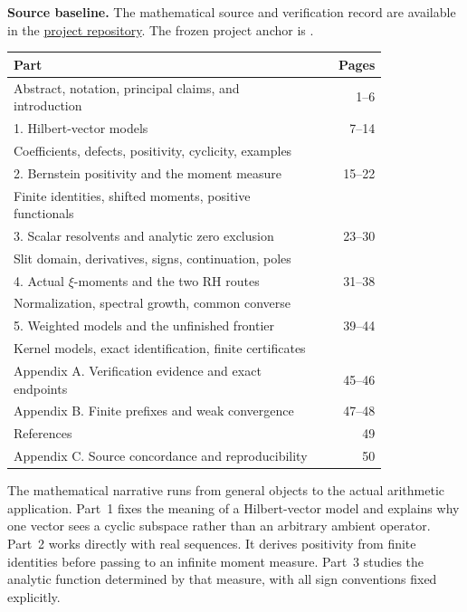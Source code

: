\medskip
\noindent\textbf{Source baseline.}
The mathematical source and verification record are available in the
\href{https://github.com/randogelist/Hilber-Vector-Resolvent-Theory}{project repository}.
The frozen project anchor is .

\begin{tabular}{@{}p{0.82\linewidth}r@{}}
\toprule
\textbf{Part} & \textbf{Pages}\\
\midrule
Abstract, notation, principal claims, and introduction & 1--6\\[5pt]
1. Hilbert-vector models & 7--14\\
\quad Coefficients, defects, positivity, cyclicity, examples & \\
2. Bernstein positivity and the moment measure & 15--22\\
\quad Finite identities, shifted moments, positive functionals & \\
3. Scalar resolvents and analytic zero exclusion & 23--30\\
\quad Slit domain, derivatives, signs, continuation, poles & \\
4. Actual $\xi$-moments and the two RH routes & 31--38\\
\quad Normalization, spectral growth, common converse & \\
5. Weighted models and the unfinished frontier & 39--44\\
\quad Kernel models, exact identification, finite certificates & \\
Appendix A. Verification evidence and exact endpoints & 45--46\\
Appendix B. Finite prefixes and weak convergence & 47--48\\
References & 49\\
Appendix C. Source concordance and reproducibility & 50\\
\bottomrule
\end{tabular}

\medskip
The mathematical narrative runs from general objects to the actual
arithmetic application. Part~1 fixes the meaning of a Hilbert-vector
model and explains why one vector sees a cyclic subspace rather than
an arbitrary ambient operator. Part~2 works directly with real
sequences. It derives positivity from finite identities before passing
to an infinite moment measure. Part~3 studies the analytic function
determined by that measure, with all sign conventions fixed explicitly.


